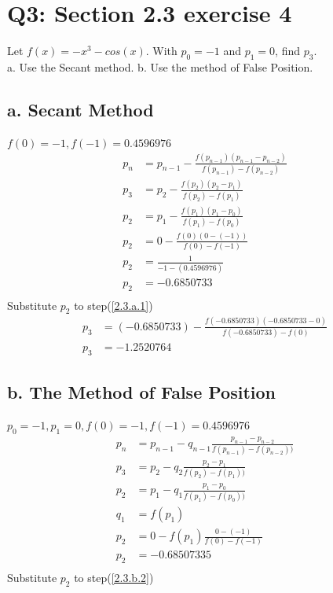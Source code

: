 \documentclass{article}
\begin{document}
\section{Q3: Section 2.3 exercise 4}
Let $f(x)=-x^3-cos(x)$. With $p_0 =-1$ and $p_1 = 0$, find $p_3$.\\
a. Use the Secant method. b. Use the method of False Position.
\subsection{a. Secant Method}
$f(0)=-1, f(-1)=0.4596976$
\begin{align}
\label{secant_theorem}p_n & = p_{n-1}-\frac{f(p_{n-1})(p_{n-1}-p_{n-2})}{f(p_{n-1})-f(p_{n-2})}\\
\label{2.3.a.1}p_3 & = p_2 - \frac{f(p_2)(p_2-p_1)}{f(p_2)-f(p_1)}\\
\label{2.3.a.2}p_2 & = p_1 - \frac{f(p_1)(p_1-p_0)}{f(p_1)-f(p_0)}\\
\label{2.3.a.3}p_2 & = 0 - \frac{f(0)(0-(-1))}{f(0)-f(-1)}\\
\label{2.3.a.4}p_2 & = \frac{1}{-1-(0.4596976)}\\
\label{2.3.a.5}p_2 & = -0.6850733\\
\end{align}
Substitute $p_2$ to step(\ref{2.3.a.1})
\begin{align}
\label{2.3.a.6}p_3 & = (-0.6850733) - \frac{f(-0.6850733)(-0.6850733-0)}{f(-0.6850733)-f(0)}\\
\label{2.3.a.7}p_3 & = -1.2520764
\end{align}

\subsection{b. The Method of False Position}
$p_0=-1, p_1=0, f(0)=-1, f(-1)=0.4596976$
\begin{align}
\label{2.3.b.1}p_n & = p_{n-1} - q_{n-1}\frac{p_{n-1}-p_{n-2}}{f(p_{n-1})-f(p_{n-2}))}\\
\label{2.3.b.2}p_3 & = p_2 - q_2\frac{p_2-p_1}{f(p_2)-f(p_1))}\\
\label{2.3.b.3}p_2 & = p_1 - q_1\frac{p_1-p_0}{f(p_1)-f(p_0))}\\
\label{2.3.b.3.1}q_1 & = f(p_1)\\
\label{2.3.b.4}p_2 & = 0 - f(p_1)\frac{0-(-1)}{f(0)-f(-1)}\\
\label{2.3.b.5}p_2 & = -0.68507335\\
\end{align}
Substitute $p_2$ to step(\ref{2.3.b.2})
\end{document}
